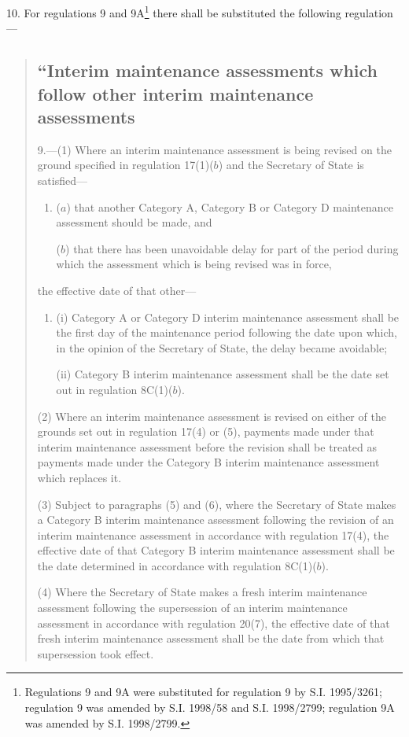 \documentclass[12pt,a4paper]{article}
\begin{document}
10.  For regulations 9 and 9A\footnote{\frenchspacing Regulations 9 and 9A were substituted for regulation 9 by S.I. 1995/3261; regulation 9 was amended by S.I. 1998/58 and S.I. 1998/2799; regulation 9A was amended by S.I. 1998/2799.} there shall be substituted the following regulation---
\begin{quotation}
\subsection*{“Interim maintenance assessments which follow other interim maintenance assessments}

9.—(1) Where an interim maintenance assessment is being revised on the ground specified in regulation 17(1)($b$) and the Secretary of State is satisfied---
\begin{enumerate}\item[]
($a$) that another Category A, Category B or Category D maintenance assessment should be made, and

($b$) that there has been unavoidable delay for part of the period during which the assessment which is being revised was in force,
\end{enumerate}
the effective date of that other---
\begin{enumerate}\item[]
(i) Category A or Category D interim maintenance assessment shall be the first day of the maintenance period following the date upon which, in the opinion of the Secretary of State, the delay became avoidable;

(ii) Category B interim maintenance assessment shall be the date set out in regulation 8C(1)($b$).
\end{enumerate}

(2) Where an interim maintenance assessment is revised on either of the grounds set out in regulation 17(4) or (5), payments made under that interim maintenance assessment before the revision shall be treated as payments made under the Category B interim maintenance assessment which replaces it.

(3) Subject to paragraphs (5) and (6), where the Secretary of State makes a Category B interim maintenance assessment following the revision of an interim maintenance assessment in accordance with regulation 17(4), the effective date of that Category B interim maintenance assessment shall be the date determined in accordance with regulation 8C(1)($b$).

(4) Where the Secretary of State makes a fresh interim maintenance assessment following the supersession of an interim maintenance assessment in accordance with regulation 20(7), the effective date of that fresh interim maintenance assessment shall be the date from which that supersession took effect.


\end{quotation}
\end{document}
